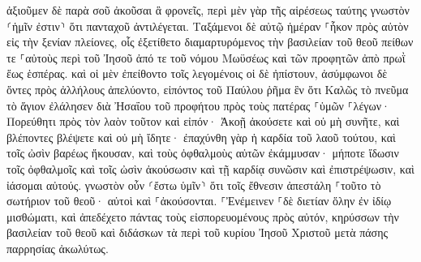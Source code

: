 \documentclass[twoside, 9pt]{extreport}
\begin{document}
ἀξιοῦμεν δὲ παρὰ σοῦ ἀκοῦσαι ἃ φρονεῖς, περὶ μὲν γὰρ τῆς αἱρέσεως ταύτης γνωστὸν ⸂ἡμῖν ἐστιν⸃ ὅτι πανταχοῦ ἀντιλέγεται. 
Ταξάμενοι δὲ αὐτῷ ἡμέραν ⸀ἧκον πρὸς αὐτὸν εἰς τὴν ξενίαν πλείονες, οἷς ἐξετίθετο διαμαρτυρόμενος τὴν βασιλείαν τοῦ θεοῦ πείθων τε ⸀αὐτοὺς περὶ τοῦ Ἰησοῦ ἀπό τε τοῦ νόμου Μωϋσέως καὶ τῶν προφητῶν ἀπὸ πρωῒ ἕως ἑσπέρας. 
καὶ οἱ μὲν ἐπείθοντο τοῖς λεγομένοις οἱ δὲ ἠπίστουν, 
ἀσύμφωνοι δὲ ὄντες πρὸς ἀλλήλους ἀπελύοντο, εἰπόντος τοῦ Παύλου ῥῆμα ἓν ὅτι Καλῶς τὸ πνεῦμα τὸ ἅγιον ἐλάλησεν διὰ Ἠσαΐου τοῦ προφήτου πρὸς τοὺς πατέρας ⸀ὑμῶν 
⸀λέγων· Πορεύθητι πρὸς τὸν λαὸν τοῦτον καὶ εἰπόν· Ἀκοῇ ἀκούσετε καὶ οὐ μὴ συνῆτε, καὶ βλέποντες βλέψετε καὶ οὐ μὴ ἴδητε· 
ἐπαχύνθη γὰρ ἡ καρδία τοῦ λαοῦ τούτου, καὶ τοῖς ὠσὶν βαρέως ἤκουσαν, καὶ τοὺς ὀφθαλμοὺς αὐτῶν ἐκάμμυσαν· μήποτε ἴδωσιν τοῖς ὀφθαλμοῖς καὶ τοῖς ὠσὶν ἀκούσωσιν καὶ τῇ καρδίᾳ συνῶσιν καὶ ἐπιστρέψωσιν, καὶ ἰάσομαι αὐτούς. 
γνωστὸν οὖν ⸂ἔστω ὑμῖν⸃ ὅτι τοῖς ἔθνεσιν ἀπεστάλη ⸀τοῦτο τὸ σωτήριον τοῦ θεοῦ· αὐτοὶ καὶ ⸀ἀκούσονται. 
⸀Ἐνέμεινεν ⸀δὲ διετίαν ὅλην ἐν ἰδίῳ μισθώματι, καὶ ἀπεδέχετο πάντας τοὺς εἰσπορευομένους πρὸς αὐτόν, 
κηρύσσων τὴν βασιλείαν τοῦ θεοῦ καὶ διδάσκων τὰ περὶ τοῦ κυρίου Ἰησοῦ Χριστοῦ μετὰ πάσης παρρησίας ἀκωλύτως. 
\end{document}
